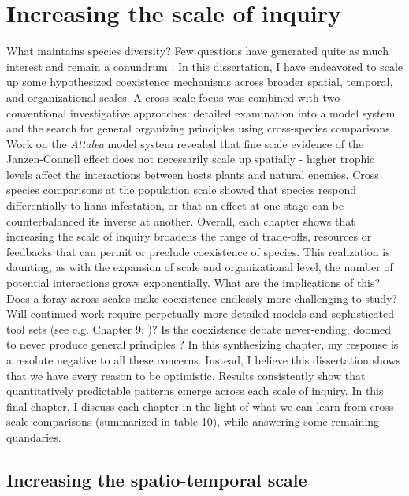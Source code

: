 \documentclass[b5paper,justified]{tufte-book} %
\begin{document}
\let\cleardoublepage\clearpage

\chapter{Increasing the scale of inquiry}
\label{ch10} 

\begin{fullwidth}
What maintains species diversity? Few questions have generated quite as much interest and remain a conundrum \citep{Leigh1999, Wright2002, Vellend2010, Turcotte2016}. In this dissertation, I have endeavored to scale up some hypothesized coexistence mechanisms across broader spatial, temporal, and organizational scales. A cross-scale focus was combined with two conventional investigative approaches: detailed examination into a model system and the search for general organizing principles using cross-species comparisons.  Work on the \textit{Attalea} model system revealed that fine scale evidence of the Janzen-Connell effect does not necessarily scale up spatially - higher trophic levels affect the interactions between hosts plants and natural enemies. Cross species comparisons at the population scale showed that species respond differentially to liana infestation, or that an effect at one stage can be counterbalanced its inverse at another. Overall, each chapter shows that increasing the scale of inquiry broadens the range of trade-offs, resources or feedbacks that can permit or preclude coexistence of species. This realization is daunting, as with the expansion of scale and organizational level, the number of potential interactions grows exponentially. What are the implications of this? Does a foray across scales make coexistence endlessly more challenging to study? Will continued work require perpetually more detailed models and sophisticated tool sets (see e.g. Chapter 9; \citealt{Bolker2013})? Is the coexistence debate never-ending, doomed to never produce general principles \citep{Lawton1999, Simberloff2004}? In this synthesizing chapter, my response is a resolute negative to all these concerns. Instead, I believe this dissertation shows that we have every reason to be optimistic. Results consistently show that quantitatively predictable patterns emerge across each scale of inquiry. In this final chapter, I discuss each chapter in the light of what we can learn from cross-scale comparisons (summarized in table 10), while answering some remaining quandaries. 

\section{Increasing the spatio-temporal scale}


\end{fullwidth}
\end{document}
